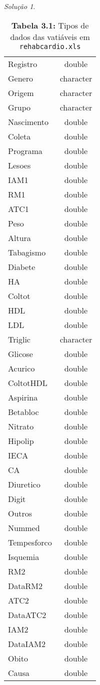 \documentclass[
]{latex/krantz}
\theoremstyle{definition}
\theoremstyle{definition}
\theoremstyle{definition}
\theoremstyle{definition}
\theoremstyle{remark}
\newtheorem*{solution}{Solução}
\begin{document}
\begin{solution}
\begin{longtable}[]{@{}lc@{}}
\caption{\textbf{Tabela 3.1:} Tipos de dados das vatiáveis em \texttt{rehabcardio.xls}}\tabularnewline
\toprule\noalign{}
\endfirsthead
\endhead
\bottomrule\noalign{}
\endlastfoot
Registro & double \\
Genero & character \\
Origem & character \\
Grupo & character \\
Nascimento & double \\
Coleta & double \\
Programa & double \\
Lesoes & double \\
IAM1 & double \\
RM1 & double \\
ATC1 & double \\
Peso & double \\
Altura & double \\
Tabagismo & double \\
Diabete & double \\
HA & double \\
Coltot & double \\
HDL & double \\
LDL & double \\
Triglic & character \\
Glicose & double \\
Acurico & double \\
ColtotHDL & double \\
Aspirina & double \\
Betabloc & double \\
Nitrato & double \\
Hipolip & double \\
IECA & double \\
CA & double \\
Diuretico & double \\
Digit & double \\
Outros & double \\
Nummed & double \\
Tempesforco & double \\
Isquemia & double \\
RM2 & double \\
DataRM2 & double \\
ATC2 & double \\
DataATC2 & double \\
IAM2 & double \\
DataIAM2 & double \\
Obito & double \\
Causa & double \\
\end{longtable}


\end{solution}
\end{document}
